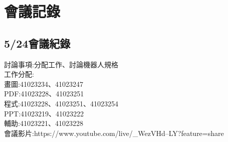 \chapter{會議記錄}


\section{5/24會議紀錄}


討論事項:分配工作、討論機器人規格\\

工作分配:\\
畫圖:41023234、41023247\\
PDF:41023228、41023251\\
程式:41023228、41023251、41023254\\
PPT:41023219、41023222\\

輔助:41023221、41023228\\

會議影片:https://www.youtube.com/live/_WezVHd--LY?feature=share\\
